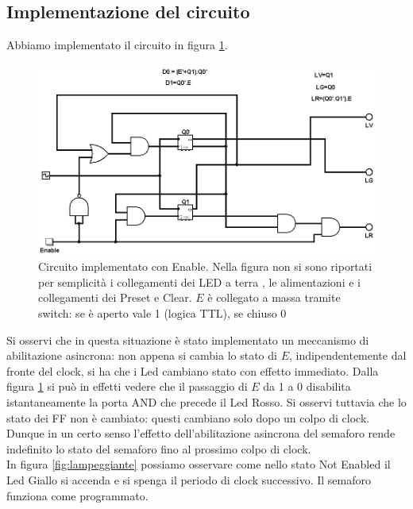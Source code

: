\documentclass[10pt,a4paper]{article}
\begin{document}
\subsection{Implementazione del circuito}
Abbiamo implementato il circuito in figura \ref{fig:circcomplete}.
\begin{figure}[!htb]
\centering
\includegraphics[scale=0.5]{circcomplete.png}
\caption{Circuito implementato con Enable. Nella figura non si sono riportati per semplicità i collegamenti dei LED a terra , le alimentazioni e i collegamenti dei Preset e Clear. $E$ è collegato a massa tramite switch: se è aperto vale 1 (logica TTL), se chiuso 0\label{fig:circcomplete}}
\end{figure}
Si osservi che in questa situazione è stato implementato un meccanismo di abilitazione asincrona: non appena si cambia lo stato di $E$, indipendentemente dal fronte del clock, si ha che i Led cambiano stato con effetto immediato. Dalla figura \ref{fig:circcomplete} si può in effetti vedere che il passaggio di $E$ da 1 a 0 disabilita istantaneamente la porta AND che precede il Led Rosso. Si osservi tuttavia che lo stato dei FF non è cambiato: questi cambiano solo dopo un colpo di clock. Dunque in un certo senso l'effetto dell'abilitazione asincrona del semaforo rende indefinito lo stato del semaforo fino al prossimo colpo di clock.\\
In figura \ref{fig:lampeggiante} possiamo osservare come nello stato Not Enabled il Led Giallo si accenda e si spenga il periodo di clock successivo. Il semaforo funziona come programmato.
\end{document}
